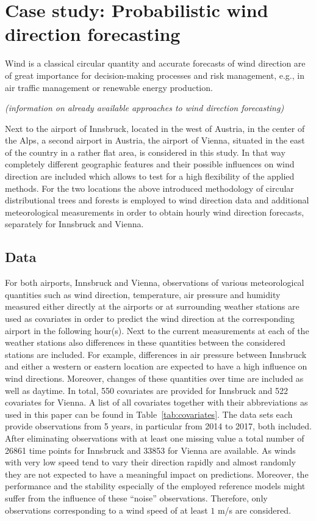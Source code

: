 \documentclass[nojss]{jss}
\newcommand{\fixme}[1]{\emph{\marginpar{FIXME} (#1)}}
\numberwithin{equation}{section}
\begin{document}
\section{Case study: Probabilistic wind direction forecasting}
\label{sec:wind}

Wind is a classical circular quantity and accurate forecasts of wind direction
are of great importance for decision-making processes and risk management,
e.g., in air traffic management or renewable energy production. 

\fixme{information on already available approaches to wind direction forecasting}

Next to the airport of Innsbruck, located in the west of Austria, in the center of the Alps,
a second airport in Austria, the airport of Vienna, situated in the east of the country in a rather flat
area, is considered in this study.
In that way completely different geographic features and their possible influences
on wind direction are included which allows to test for a high flexibility of the applied methods.
For the two locations the above introduced methodology of circular distributional trees and forests is
employed to wind direction data and additional meteorological measurements in order to obtain hourly 
wind direction forecasts, separately for Innsbruck and Vienna.


\subsection{Data}
For both airports, Innsbruck and Vienna, observations of various meteorological quantities 
such as wind direction, temperature, air pressure and humidity
measured either directly at the airports or at surrounding weather stations are used as 
covariates in order to predict the wind direction at the corresponding airport 
in the following hour(s).
Next to the current measurements at each of the weather stations also differences in these 
quantities between the considered stations are included. For example, differences in air 
pressure between Innsbruck and either a western or eastern location are expected to have a 
high influence on wind directions. Moreover, changes of these quantities over time are 
included as well as daytime. In total, 550 covariates are provided for Innsbruck and 522 
covariates for Vienna. 
A list of all covariates together with their abbreviations as used in this paper
can be found in Table~\ref{tab:covariates}.
The data sets each provide observations from 5 years, in particular from 2014 to 2017, both included.
After eliminating observations with at least one missing value a total number of 26861 time points
for Innsbruck and 33853 for Vienna are available.
As winds with very low speed tend to vary their direction rapidly and almost randomly they are not 
expected to have a meaningful impact on predictions. Moreover, the performance and the stability 
especially of the employed reference models might suffer from the influence of these ``noise'' 
observations. Therefore, only observations corresponding to a wind speed of at least $1$ m/s are 
considered.
\end{document}
